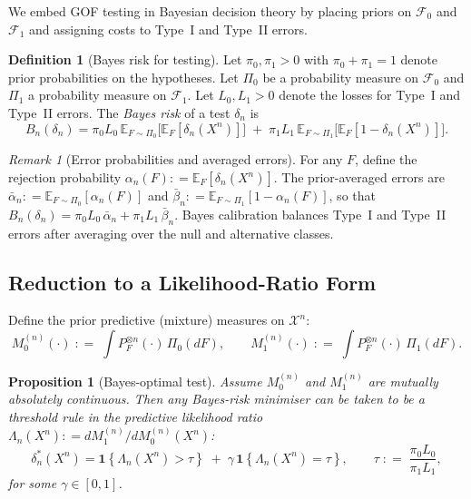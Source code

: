 \documentclass[11pt]{article}
\newcommand{\defeq}{\mathrel{\mathop:}=}
\newcommand{\E}{\mathbb{E}}
\newcommand{\calX}{\mathcal{X}}
\newcommand{\calF}{\mathcal{F}}
\newcommand{\1}{\mathbf{1}}
\theoremstyle{plain}
\newtheorem{proposition}[theorem]{Proposition}
\theoremstyle{definition}
\newtheorem{definition}[theorem]{Definition}
\theoremstyle{remark}
\newtheorem{remark}[theorem]{Remark}
\begin{document}
We embed GOF testing in Bayesian decision theory by placing priors on $\calF_0$ and $\calF_1$ and assigning costs to Type~I and Type~II errors.

\begin{definition}[Bayes risk for testing]\label{def:bayes-risk}
Let $\pi_0,\pi_1>0$ with $\pi_0+\pi_1=1$ denote prior probabilities on the hypotheses.
Let $\Pi_0$ be a probability measure on $\calF_0$ and $\Pi_1$ a probability measure on $\calF_1$.
Let $L_0,L_1>0$ denote the losses for Type~I and Type~II errors.
The \emph{Bayes risk} of a test $\delta_n$ is
\begin{equation}\label{eq:bayes-risk}
B_n(\delta_n)
=
\pi_0 L_0\, \E_{F\sim \Pi_0}\!\big[\E_F[\delta_n(X^n)]\big]
\;+\;
\pi_1 L_1\, \E_{F\sim \Pi_1}\!\big[\E_F[1-\delta_n(X^n)]\big].
\end{equation}
\end{definition}

\begin{remark}[Error probabilities and averaged errors]\label{rem:avg-errors}
For any $F$, define the rejection probability $\alpha_n(F)\defeq\E_F[\delta_n(X^n)]$.
The prior-averaged errors are $\bar\alpha_n \defeq \E_{F\sim\Pi_0}[\alpha_n(F)]$ and $\bar\beta_n \defeq \E_{F\sim\Pi_1}[1-\alpha_n(F)]$,
so that $B_n(\delta_n)=\pi_0 L_0\,\bar\alpha_n+\pi_1 L_1\,\bar\beta_n$.
Bayes calibration balances Type~I and Type~II errors after averaging over the null and alternative classes.
\end{remark}

\subsection{Reduction to a Likelihood-Ratio Form}\label{subsec:lr-reduction}

Define the prior predictive (mixture) measures on $\calX^n$:
\[
M_0^{(n)}(\cdot)\;\defeq\;\int P_F^{\otimes n}(\cdot)\,\Pi_0(dF),
\qquad
M_1^{(n)}(\cdot)\;\defeq\;\int P_F^{\otimes n}(\cdot)\,\Pi_1(dF).
\]

\begin{proposition}[Bayes-optimal test]\label{prop:bayes-np}
Assume $M_0^{(n)}$ and $M_1^{(n)}$ are mutually absolutely continuous.
Then any Bayes-risk minimiser can be taken to be a threshold rule in the predictive likelihood ratio $\Lambda_n(X^n)\defeq dM_1^{(n)}/dM_0^{(n)}(X^n)$:
\begin{equation}\label{eq:bayes-optimal-test}
\delta_n^*(X^n)
=
\1\!\left\{\Lambda_n(X^n)>\tau\right\}
\;+\;
\gamma\,\1\!\left\{\Lambda_n(X^n)=\tau\right\},
\qquad
\tau\;\defeq\;\frac{\pi_0 L_0}{\pi_1 L_1},
\end{equation}
for some $\gamma\in[0,1]$.
\end{proposition}
\end{document}
